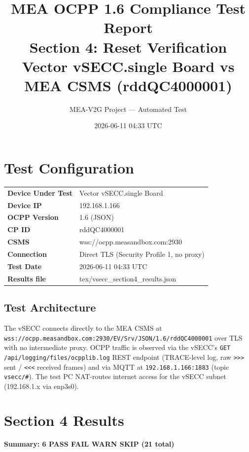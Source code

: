 \documentclass[10pt, a4paper]{article}
\title{\textbf{MEA OCPP 1.6 Compliance Test Report}\\[0.3em]
\large Section 4: Reset Verification\\[0.3em]
\normalsize Vector vSECC.single Board vs MEA CSMS (rddQC4000001)}
\author{MEA-V2G Project --- Automated Test}
\date{2026-06-11 04:33 UTC}
\begin{document}
\maketitle
\tableofcontents
\newpage

\section{Test Configuration}
\begin{tabular}{ll}
\textbf{Device Under Test} & Vector vSECC.single Board \\
\textbf{Device IP}         & 192.168.1.166 \\
\textbf{OCPP Version}      & 1.6 (JSON) \\
\textbf{CP ID}             & rddQC4000001 \\
\textbf{CSMS}              & wss://ocpp.measandbox.com:2930 \\
\textbf{Connection}        & Direct TLS (Security Profile 1, no proxy) \\
\textbf{Test Date}         & 2026-06-11 04:33 UTC \\
\textbf{Results file}      & tex/vsecc\_section4\_results.json \\
\end{tabular}

\subsection*{Test Architecture}
The vSECC connects directly to the MEA CSMS at
\texttt{wss://ocpp.measandbox.com:2930/EV/Srv/JSON/1.6/rddQC4000001}
over TLS with no intermediate proxy.
OCPP traffic is observed via the vSECC's \texttt{GET /api/logging/files/ocpplib.log}
REST endpoint (TRACE-level log, raw \texttt{>>>} sent / \texttt{<<<} received frames)
and via MQTT at \texttt{192.168.1.166:1883} (topic \texttt{vsecc/\#}).
The test PC NAT-routes internet access for the vSECC subnet (192.168.1.x via enp3s0).

\section{Section 4 Results}
\textbf{Summary: 6 PASS  FAIL  WARN  SKIP \quad (21 total)}
\end{document}
